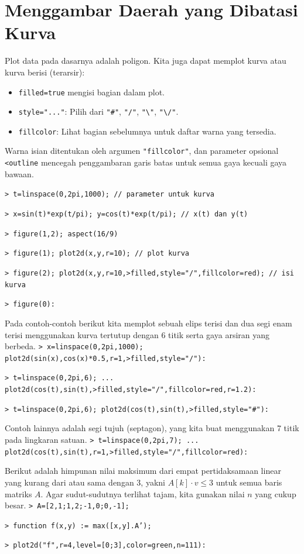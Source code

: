 \documentclass[11pt, a4paper]{article}
\newcommand{\emtcmd}[1]{\noindent\texttt{\textcolor{emtcommand}{>}\ #1}\par\smallskip}
\begin{document}
\section*{Menggambar Daerah yang Dibatasi Kurva}

Plot data pada dasarnya adalah poligon. Kita juga dapat memplot kurva atau kurva berisi (terarsir):
\begin{itemize}
    \item \texttt{filled=true} mengisi bagian dalam plot.
    \item \texttt{style="..."}: Pilih dari \texttt{"\#"}, \texttt{"/"}, \texttt{"\textbackslash"}, \texttt{"\textbackslash/"}.
    \item \texttt{fillcolor}: Lihat bagian sebelumnya untuk daftar warna yang tersedia.
\end{itemize}

Warna isian ditentukan oleh argumen \texttt{"fillcolor"}, dan parameter opsional \texttt{<outline} mencegah penggambaran garis batas untuk semua gaya kecuali gaya bawaan.

\emtcmd{t=linspace(0,2pi,1000); \textcolor{emtcomment}{// parameter untuk kurva}}
\emtcmd{x=sin(t)*exp(t/pi); y=cos(t)*exp(t/pi); \textcolor{emtcomment}{// x(t) dan y(t)}}
\emtcmd{figure(1,2); aspect(16/9)}
\emtcmd{figure(1); plot2d(x,y,r=10); \textcolor{emtcomment}{// plot kurva}}
\emtcmd{figure(2); plot2d(x,y,r=10,>filled,style="/",fillcolor=red); \textcolor{emtcomment}{// isi kurva}}
\emtcmd{figure(0):}

Pada contoh-contoh berikut kita memplot sebuah elips terisi dan dua segi enam terisi menggunakan kurva tertutup dengan 6 titik serta gaya arsiran yang berbeda.
\emtcmd{x=linspace(0,2pi,1000); plot2d(sin(x),cos(x)*0.5,r=1,>filled,style="/"):}
\emtcmd{t=linspace(0,2pi,6); ... \\
\hspace*{1em} plot2d(cos(t),sin(t),>filled,style="/",fillcolor=red,r=1.2):}
\emtcmd{t=linspace(0,2pi,6); plot2d(cos(t),sin(t),>filled,style="\#"):}

Contoh lainnya adalah segi tujuh (septagon), yang kita buat menggunakan 7 titik pada lingkaran satuan.
\emtcmd{t=linspace(0,2pi,7); ... \\
\hspace*{1em} plot2d(cos(t),sin(t),r=1,>filled,style="/",fillcolor=red):}

Berikut adalah himpunan nilai maksimum dari empat pertidaksamaan linear yang kurang dari atau sama dengan 3, yakni $A[k] \cdot v \le 3$ untuk semua baris matriks $A$. Agar sudut-sudutnya terlihat tajam, kita gunakan nilai $n$ yang cukup besar.
\emtcmd{A=[2,1;1,2;-1,0;0,-1];}
\emtcmd{function f(x,y) := max([x,y].A');}
\emtcmd{plot2d("f",r=4,level=[0;3],color=green,n=111):}
\end{document}
